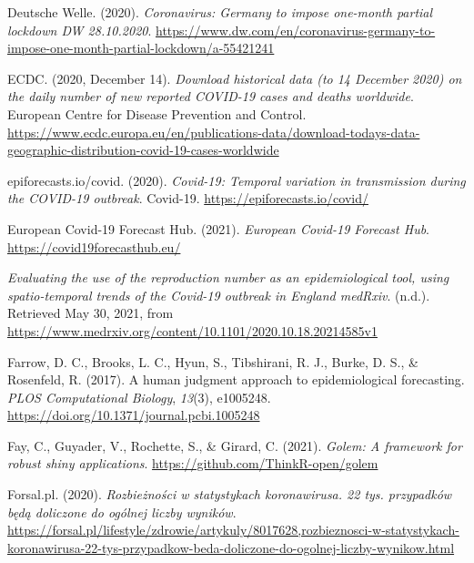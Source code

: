 \documentclass[
]{article}
\newlength{\cslhangindent}
\newlength{\cslentryspacingunit} %
\newenvironment{CSLReferences}[2] %
 {%
  \setlength{\parindent}{0pt}
  \ifodd #1
  \let\oldpar\par
  \def\par{\hangindent=\cslhangindent\oldpar}
  \fi
  \setlength{\parskip}{#2\cslentryspacingunit}
 }%
 {}
\begin{document}
\begin{CSLReferences}{1}{0}
\leavevmode{}%
Deutsche Welle. (2020). \emph{Coronavirus: Germany to impose one-month partial lockdown \textbar{} {DW} \textbar{} 28.10.2020}. \url{https://www.dw.com/en/coronavirus-germany-to-impose-one-month-partial-lockdown/a-55421241}

\leavevmode{}%
ECDC. (2020, December 14). \emph{Download historical data (to 14 {December} 2020) on the daily number of new reported {COVID}-19 cases and deaths worldwide}. {European Centre for Disease Prevention and Control}. \url{https://www.ecdc.europa.eu/en/publications-data/download-todays-data-geographic-distribution-covid-19-cases-worldwide}

\leavevmode{}%
epiforecasts.io/covid. (2020). \emph{Covid-19: Temporal variation in transmission during the {COVID}-19 outbreak}. {Covid-19}. \url{https://epiforecasts.io/covid/}

\leavevmode{}%
European Covid-19 Forecast Hub. (2021). \emph{European {Covid}-19 {Forecast Hub}}. \url{https://covid19forecasthub.eu/}

\leavevmode{}%
\emph{Evaluating the use of the reproduction number as an epidemiological tool, using spatio-temporal trends of the {Covid}-19 outbreak in {England} \textbar{} {medRxiv}}. (n.d.). Retrieved May 30, 2021, from \url{https://www.medrxiv.org/content/10.1101/2020.10.18.20214585v1}

\leavevmode{}%
Farrow, D. C., Brooks, L. C., Hyun, S., Tibshirani, R. J., Burke, D. S., \& Rosenfeld, R. (2017). A human judgment approach to epidemiological forecasting. \emph{PLOS Computational Biology}, \emph{13}(3), e1005248. \url{https://doi.org/10.1371/journal.pcbi.1005248}

\leavevmode{}%
Fay, C., Guyader, V., Rochette, S., \& Girard, C. (2021). \emph{Golem: A framework for robust shiny applications}. \url{https://github.com/ThinkR-open/golem}

\leavevmode{}%
Forsal.pl. (2020). \emph{Rozbieżności w statystykach koronawirusa. 22 tys. przypadków będą doliczone do ogólnej liczby wyników}. \url{https://forsal.pl/lifestyle/zdrowie/artykuly/8017628,rozbieznosci-w-statystykach-koronawirusa-22-tys-przypadkow-beda-doliczone-do-ogolnej-liczby-wynikow.html}


\end{CSLReferences}
\end{document}
